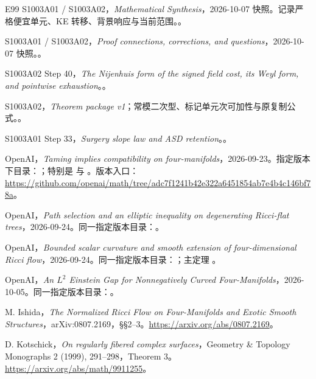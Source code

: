 \documentclass[UTF8,11pt,openany,fontset=none]{ctexbook}
\theoremstyle{definition}
\theoremstyle{remark}
\begin{document}
\begin{thebibliography}{E99}
 S1003A01 / S1003A02，\emph{Mathematical Synthesis}，2026-10-07 快照。记录严格便宜单元、KE 转移、背景响应与当前范围。。

 S1003A01 / S1003A02，\emph{Proof connections, corrections, and questions}，2026-10-07 快照。。

 S1003A02 Step 40，\emph{The Nijenhuis form of the signed field cost, its Weyl form, and pointwise exhaustion}。。

 S1003A02，\emph{Theorem package v1}；常模二次型、标记单元次可加性与原复制公式。。

 S1003A01 Step 33，\emph{Surgery slope law and ASD retention}。。

 OpenAI，\emph{Taming implies compatibility on four-manifolds}，2026-09-23。指定版本下目录：；特别是  与 。版本入口：\url{https://github.com/openai/math/tree/adc7f1241b42e322a6451854ab7e4b4c146bf78a}。

 OpenAI，\emph{Path selection and an elliptic inequality on degenerating Ricci-flat trees}，2026-09-24。同一指定版本目录：。

 OpenAI，\emph{Bounded scalar curvature and smooth extension of four-dimensional Ricci flow}，2026-09-24。同一指定版本目录：；主定理 。

 OpenAI，\emph{An \(L^2\) Einstein Gap for Nonnegatively Curved Four-Manifolds}，2026-10-05。同一指定版本目录：。

 M. Ishida，\emph{The Normalized Ricci Flow on Four-Manifolds and Exotic Smooth Structures}，arXiv:0807.2169，§§2--3。\url{https://arxiv.org/abs/0807.2169}。

 D. Kotschick，\emph{On regularly fibered complex surfaces}，Geometry \& Topology Monographs 2 (1999), 291--298，Theorem 3。\url{https://arxiv.org/abs/math/9911255}。


\end{thebibliography}
\end{document}
